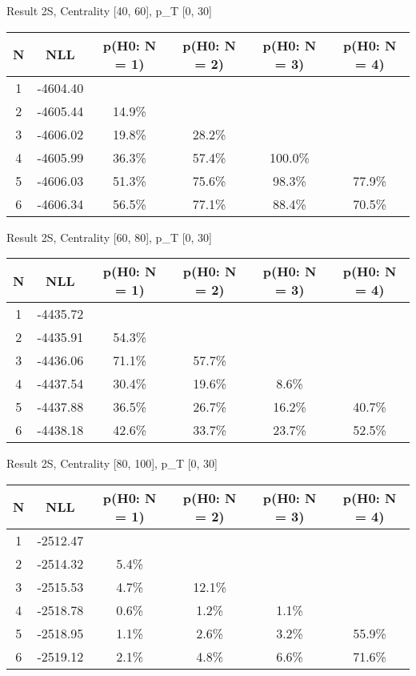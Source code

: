 Result 2S, Centrality [40, 60], p_{T} [0, 30]
\begin{table}[h!]
	\centering
	\begin{tabular}{cc||cccc}
		N & NLL & p(H0: N = 1) & p(H0: N = 2) & p(H0: N = 3) & p(H0: N = 4)\\ 
		\hline
1 & -4604.40 & & & & \\
2 & -4605.44 & 14.9\% & & & \\
3 & -4606.02 & 19.8\% & 28.2\% & & \\
4 & -4605.99 & 36.3\% & 57.4\% & 100.0\% & \\
5 & -4606.03 & 51.3\% & 75.6\% & 98.3\% & 77.9\% \\
6 & -4606.34 & 56.5\% & 77.1\% & 88.4\% & 70.5\% \\
	\end{tabular}
	\label{tab:lab}
\end{table}

Result 2S, Centrality [60, 80], p_{T} [0, 30]
\begin{table}[h!]
	\centering
	\begin{tabular}{cc||cccc}
		N & NLL & p(H0: N = 1) & p(H0: N = 2) & p(H0: N = 3) & p(H0: N = 4)\\ 
		\hline
1 & -4435.72 & & & & \\
2 & -4435.91 & 54.3\% & & & \\
3 & -4436.06 & 71.1\% & 57.7\% & & \\
4 & -4437.54 & 30.4\% & 19.6\% & 8.6\% & \\
5 & -4437.88 & 36.5\% & 26.7\% & 16.2\% & 40.7\% \\
6 & -4438.18 & 42.6\% & 33.7\% & 23.7\% & 52.5\% \\
	\end{tabular}
	\label{tab:lab}
\end{table}

Result 2S, Centrality [80, 100], p_{T} [0, 30]
\begin{table}[h!]
	\centering
	\begin{tabular}{cc||cccc}
		N & NLL & p(H0: N = 1) & p(H0: N = 2) & p(H0: N = 3) & p(H0: N = 4)\\ 
		\hline
1 & -2512.47 & & & & \\
2 & -2514.32 & 5.4\% & & & \\
3 & -2515.53 & 4.7\% & 12.1\% & & \\
4 & -2518.78 & 0.6\% & 1.2\% & 1.1\% & \\
5 & -2518.95 & 1.1\% & 2.6\% & 3.2\% & 55.9\% \\
6 & -2519.12 & 2.1\% & 4.8\% & 6.6\% & 71.6\% \\
	\end{tabular}
	\label{tab:lab}
\end{table}

